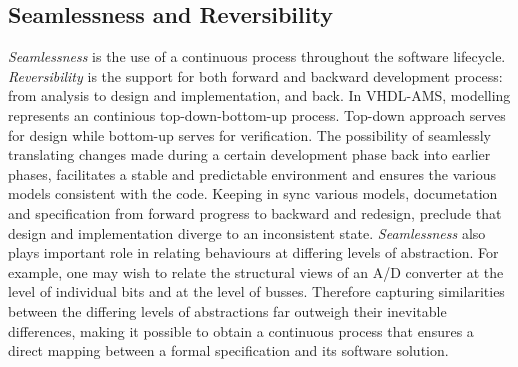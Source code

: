 \documentclass{article}
\begin{document}
\subsection{Seamlessness and Reversibility}
\emph{Seamlessness} is the use of a continuous process 
throughout the software lifecycle.
\emph{Reversibility} is the support for both forward and 
backward development process: from analysis to design 
and implementation, and back.
In VHDL-AMS, modelling represents an continious top-down-bottom-up
process. Top-down approach serves for design while bottom-up
serves for verification. The possibility of seamlessly translating 
changes made during a certain development phase back into earlier phases,
facilitates a stable and predictable environment and ensures the various 
models consistent with the code. Keeping in sync various models, documetation
and specification from forward progress to backward and redesign, preclude 
that design and implementation diverge to an inconsistent state. 
\emph{Seamlessness} also plays important role in relating behaviours at 
differing levels of abstraction. For example, one may wish to relate the 
structural views of an A/D converter at the level of individual bits and 
at the level of busses. Therefore capturing similarities between the 
differing levels of abstractions far outweigh their inevitable differences, 
making it possible to obtain a continuous process that ensures a direct 
mapping between a formal specification and its software solution.
    
\end{document}
